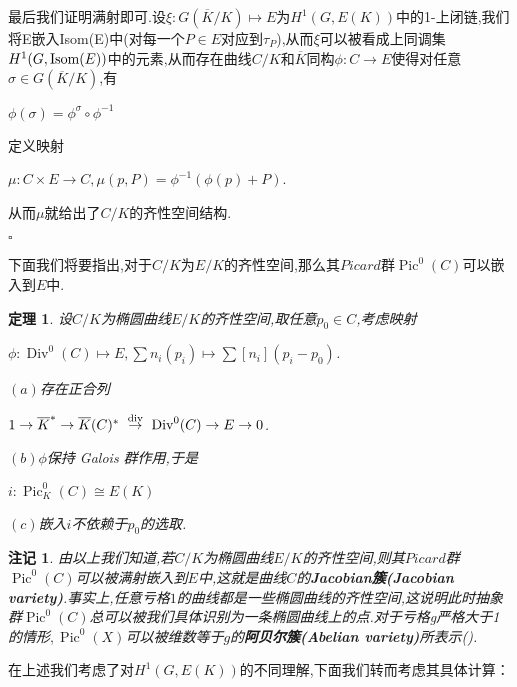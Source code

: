 \documentclass[11pt]{ctexart}
\DeclareMathOperator{\Div}{Div}
\DeclareMathOperator{\Pic}{Pic}
\newtheorem{thm}{定理}[section]
\newtheorem{rem}{注记}[section]
\begin{document}
最后我们证明满射即可.设$\xi :G(\overline{K}/K)\mapsto E$为$H^1(G,E(K))$中的1-上闭链,我们将E嵌入Isom(E)中(对每一个$P\in E$对应到$\tau_P$),从而$\xi$可以被看成上同调集$H^1(G,\textup{Isom}(E))$中的元素,从而存在曲线$C/K$和$\overline{K}$同构$\phi:C \rightarrow E$使得对任意$\sigma\in G(\overline{K}/K)$,有
\begin{center}
    $\phi(\sigma)=\phi^{\sigma}\circ \phi^{-1}$
\end{center}
定义映射
\begin{center}
    $\mu:C \times E \rightarrow C$$,\mu(p,P)=\phi^{-1}(\phi(p)+P)$.
\end{center}
从而$\mu$就给出了$C/K$的齐性空间结构.

\hfill $\square$


下面我们将要指出,对于$C/K$为$E/K$的齐性空间,那么其$Picard$群$\Pic^{0}(C)$可以嵌入到$E$中.
\begin{thm}设$C/K$为椭圆曲线$E/K$的齐性空间,取任意$p_0\in C$,考虑映射
    \begin{center}
        $\phi:\Div^{0}(C)\mapsto E$$,\sum n_i(p_i)\mapsto \sum [n_i](p_i-p_0)$.
    \end{center}

    $(a)$存在正合列
     \begin{center}
        $1\rightarrow \overline{K}^{*}\rightarrow \overline{K}(C)^{*}~ \overset{\textup{div}}{\rightarrow} ~\Div^{0}(C)\rightarrow E \rightarrow 0$.
     \end{center}


     $(b)\phi$保持 Galois 群作用,于是 
     \begin{center}
        $i:\Pic^0_K(C) \cong  E(K)$
     \end{center}

     $(c)$嵌入$i$不依赖于$p_0$的选取.

\end{thm}
\begin{rem}由以上我们知道,若$C/K$为椭圆曲线$E/K$的齐性空间,则其$Picard$群$\Pic^0(C)$可以被满射嵌入到$E$中,这就是曲线$C$的\textbf{Jacobian簇(Jacobian variety)}.事实上,任意亏格$1$的曲线都是一些椭圆曲线的齐性空间,这说明此时抽象群$\Pic^{0}(C)$总可以被我们具体识别为一条椭圆曲线上的点.对于亏格g严格大于1的情形$,\Pic^{0}(X)$可以被维数等于$g$的\textbf{阿贝尔簇(Abelian variety)}所表示(\cite{GTM201}).

\end{rem}

在上述我们考虑了对$H^1(G,E(K))$的不同理解,下面我们转而考虑其具体计算：
\end{document}
